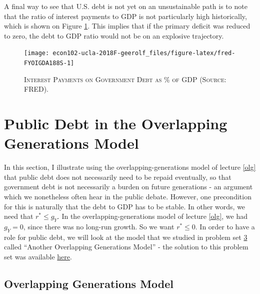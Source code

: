 \documentclass[]{book}
\theoremstyle{definition}
\theoremstyle{definition}
\theoremstyle{definition}
\theoremstyle{remark}
\begin{document}
A final way to see that U.S. debt is not yet on an unsustainable path is
to note that the ratio of interest payments to GDP is not particularly
high historically, which is shown on Figure \ref{fig:fred-FYOIGDA188S}.
This implies that if the primary deficit was reduced to zero, the debt
to GDP ratio would not be on an explosive trajectory.




\begin{figure}

{\centering \texttt{[image: econ102-ucla-2018F-geerolf\_files/figure-latex/fred-FYOIGDA188S-1]} 

}

\caption{\textsc{Interest Payments on Government Debt as
\% of GDP (Source: FRED).}}\label{fig:fred-FYOIGDA188S}
\end{figure}

\section{Public Debt in the Overlapping Generations
Model}\label{public-debt-in-the-overlapping-generations-model}

In this section, I illustrate using the overlapping-generations model of
lecture \ref{olg} that public debt does not necessarily need to be
repaid eventually, so that government debt is not necessarily a burden
on future generations - an argument which we nonetheless often hear in
the public debate. However, one precondition for this is naturally that
the debt to GDP has to be stable. In other words, we need that
\(r^{*} \leq g_Y\). In the overlapping-generations model of lecture
\ref{olg}, we had \(g_Y = 0\), since there was no long-run growth. So we
want \(r^{*} \leq 0\). In order to have a role for public debt, we will
look at the model that we studied in problem set
\protect\hyperlink{pset3}{3} called ``Another Overlapping Generations
Model'' - the solution to this problem set was available
\protect\hyperlink{pset3-sol}{here}.

\subsection{Overlapping Generations
Model}\label{overlapping-generations-model}
\end{document}
